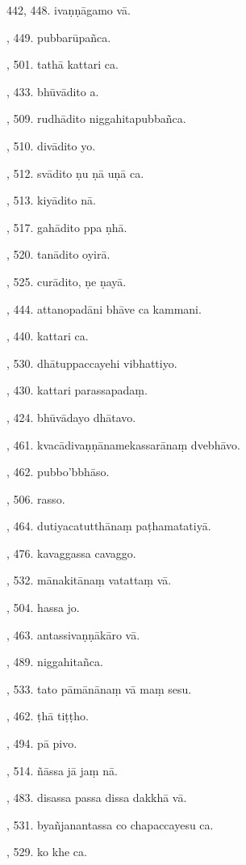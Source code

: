 442, 448. ivaṇṇāgamo vā.\par {}, 449. pubbarūpañca.\par {}, 501. tathā kattari ca.\par {}, 433. bhūvādito a.\par {}, 509. rudhādito niggahitapubbañca.\par {}, 510. divādito yo.\par {}, 512. svādito ṇu ṇā uṇā ca.\par {}, 513. kiyādito nā.\par {}, 517. gahādito ppa ṇhā.\par {}, 520. tanādito oyirā.\par {}, 525. curādito, ṇe ṇayā.\par {}, 444. attanopadāni bhāve ca kammani.\par {}, 440. kattari ca.\par {}, 530. dhātuppaccayehi vibhattiyo.\par {}, 430. kattari parassapadaṃ.\par {}, 424. bhūvādayo dhātavo.\par {}, 461. kvacādivaṇṇānamekassarānaṃ dvebhāvo.\par {}, 462. pubbo’bbhāso.\par {}, 506. rasso.\par {}, 464. dutiyacatutthānaṃ paṭhamatatiyā.\par {}, 476. kavaggassa cavaggo.\par {}, 532. mānakitānaṃ vatattaṃ vā.\par {}, 504. hassa jo.\par {}, 463. antassivaṇṇākāro vā.\par {}, 489. niggahitañca.\par {}, 533. tato pāmānānaṃ vā maṃ sesu.\par {}, 462. ṭhā tiṭṭho.\par {}, 494. pā pivo.\par {}, 514. ñāssa jā jaṃ nā.\par {}, 483. disassa passa dissa dakkhā vā.\par {}, 531. byañjanantassa co chapaccayesu ca.\par {}, 529. ko khe ca.\par \noindent
